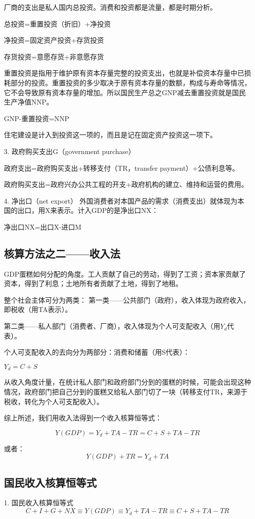 \documentclass{article}
\begin{document}
厂商的支出是私人国内总投资。消费和投资都是流量，都是时期分析。

总投资=重置投资（折旧）+净投资

净投资=固定资产投资+存货投资

存货投资=意愿存货+非意愿存货

重置投资是指用于维护原有资本存量完整的投资支出，也就是补偿资本存量中已损耗部分的投资。重置投资的多少取决于原有资本存量的数额，构成与寿命等情况，它不会导致原有资本存量的增加。所以国民生产总之GNP减去重置投资就是国民生产净值NNP。

GNP-重置投资=NNP

住宅建设是计入到投资这一项的，而且是记在固定资产投资这一项下。

\hspace*{\fill}

3. 政府购买支出G（government purchase）

政府支出=政府购买支出+转移支付（TR，transfer payment）+公债利息等。

政府购买支出=政府兴办公共工程的开支+政府机构的建立、维持和运营的费用。

4. 净出口（net export）
外国消费者对本国产品的需求（消费支出）就体现为本国的出口，用X来表示。计入GDP的是净出口NX：

净出口NX=出口X-进口M

\subsection{核算方法之二——收入法}
GDP蛋糕如何分配的角度。工人贡献了自己的劳动，得到了工资；资本家贡献了资本，得到了利息；土地所有者贡献了土地，得到了地租。

整个社会主体可分为两类：
第一类——公共部门（政府），收入体现为政府收入，即税收（用TA表示）。

第二类——私人部门（消费者、厂商），收入体现为个人可支配收入（用$ Y_d $代表）。

个人可支配收入的去向分为两部分：消费和储蓄（用S代表）：

$ Y_d=C+S $

从收入角度计量，在统计私人部门和政府部门分到的蛋糕的时候，可能会出现这种情况，政府部门把自己分到的蛋糕又给私人部门切了一块（转移支付TR，来源于税收，转化为个人可支配收入）。

综上所述，我们用收入法得到一个收入核算恒等式：

\[
Y(GDP)=Y_d+TA-TR=C+S+TA-TR
\]

或者：
\[
Y(GDP)+TR=Y_d+TA
\]

\subsection{国民收入核算恒等式}
1. 国民收入核算恒等式
\[
C+I+G+NX\equiv Y(GDP)\equiv Y_d+TA-TR\equiv C+S+TA-TR
\]
\end{document}
